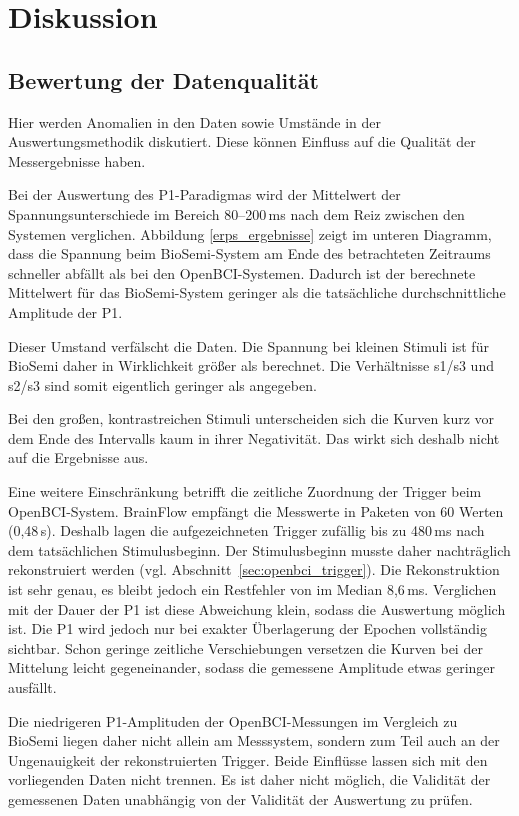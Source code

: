 \chapter{Diskussion}
\section{Bewertung der Datenqualität}
Hier werden Anomalien in den Daten sowie Umstände in der Auswertungsmethodik diskutiert. Diese können Einfluss auf die Qualität der Messergebnisse haben.

Bei der Auswertung des P1-Paradigmas wird der Mittelwert der Spannungsunterschiede im Bereich 80--200\,ms nach dem Reiz zwischen den Systemen verglichen. Abbildung \ref{erps_ergebnisse} zeigt im unteren Diagramm, dass die Spannung beim BioSemi-System am Ende des betrachteten Zeitraums schneller abfällt als bei den OpenBCI-Systemen. Dadurch ist der berechnete Mittelwert für das BioSemi-System geringer als die tatsächliche durchschnittliche Amplitude der P1.

Dieser Umstand verfälscht die Daten. Die Spannung bei kleinen Stimuli ist für BioSemi daher in Wirklichkeit größer als berechnet. Die Verhältnisse s1/s3 und s2/s3 sind somit eigentlich geringer als angegeben.

Bei den großen, kontrastreichen Stimuli unterscheiden sich die Kurven kurz vor dem Ende des Intervalls kaum in ihrer Negativität. Das wirkt sich deshalb nicht auf die Ergebnisse aus.

Eine weitere Einschränkung betrifft die zeitliche Zuordnung der Trigger beim OpenBCI-System. BrainFlow empfängt die Messwerte in Paketen von 60 Werten (0,48\,s). Deshalb lagen die aufgezeichneten Trigger zufällig bis zu 480\,ms nach dem tatsächlichen Stimulusbeginn. Der Stimulusbeginn musste daher nachträglich rekonstruiert werden (vgl. Abschnitt~\ref{sec:openbci_trigger}). Die Rekonstruktion ist sehr genau, es bleibt jedoch ein Restfehler von im Median 8,6\,ms. Verglichen mit der Dauer der P1 ist diese Abweichung klein, sodass die Auswertung möglich ist. Die P1 wird jedoch nur bei exakter Überlagerung der Epochen vollständig sichtbar. Schon geringe zeitliche Verschiebungen versetzen die Kurven bei der Mittelung leicht gegeneinander, sodass die gemessene Amplitude etwas geringer ausfällt.

Die niedrigeren P1-Amplituden der OpenBCI-Messungen im Vergleich zu BioSemi liegen daher nicht allein am Messsystem, sondern zum Teil auch an der Ungenauigkeit der rekonstruierten Trigger. Beide Einflüsse lassen sich mit den vorliegenden Daten nicht trennen. Es ist daher nicht möglich, die Validität der gemessenen Daten unabhängig von der Validität der Auswertung zu prüfen.

